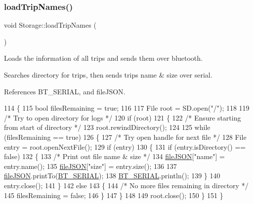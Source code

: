 \subsubsection{\texorpdfstring{load\+Trip\+Names()}{loadTripNames()}}
{\footnotesize\ttfamily void Storage\+::load\+Trip\+Names (\begin{DoxyParamCaption}{ }\end{DoxyParamCaption})}



Loads the information of all trips and sends them over bluetooth. 

Searches directory for trips, then sends trip\textquotesingle{}s name \& size over serial. 

References B\+T\+\_\+\+S\+E\+R\+I\+AL, and file\+J\+S\+ON.


\begin{DoxyCode}
114 \{
115   \textcolor{keywordtype}{bool} filesRemaining = \textcolor{keyword}{true};
116 
117   File root = SD.open(\textcolor{stringliteral}{"/"});
118 
119   \textcolor{comment}{/* Try to open directory for logs */}
120   \textcolor{keywordflow}{if} (root)
121   \{
122     \textcolor{comment}{/* Ensure starting from start of directory */}
123     root.rewindDirectory();
124 
125     \textcolor{keywordflow}{while} (filesRemaining == \textcolor{keyword}{true})
126     \{
127       \textcolor{comment}{/* Try open handle for next file */}
128       File entry = root.openNextFile();
129       \textcolor{keywordflow}{if} (entry)
130       \{
131         \textcolor{keywordflow}{if} (entry.isDirectory() == \textcolor{keyword}{false})
132         \{
133           \textcolor{comment}{/* Print out file name & size */}
134           \hyperlink{class_storage_ac503241aaa812f9b8ee36dd10cbd915a}{fileJSON}[\textcolor{stringliteral}{"name"}] = entry.name();
135           \hyperlink{class_storage_ac503241aaa812f9b8ee36dd10cbd915a}{fileJSON}[\textcolor{stringliteral}{"size"}] = entry.size();
136 
137           \hyperlink{class_storage_ac503241aaa812f9b8ee36dd10cbd915a}{fileJSON}.printTo(\hyperlink{_storage_8cpp_ad1e6e6f6fc813b305067b9e1b0777ea6}{BT\_SERIAL});
138           \hyperlink{_storage_8cpp_ad1e6e6f6fc813b305067b9e1b0777ea6}{BT\_SERIAL}.println();
139         \}
140         entry.close();
141       \}
142       \textcolor{keywordflow}{else}
143       \{
144         \textcolor{comment}{/* No more files remaining in directory */}
145         filesRemaining = \textcolor{keyword}{false};
146       \}
147     \}
148 
149     root.close();
150   \}
151 \}
\end{DoxyCode}
\mbox{\label{class_storage_af56ca8289ed925300e3385114c561eec}} 
